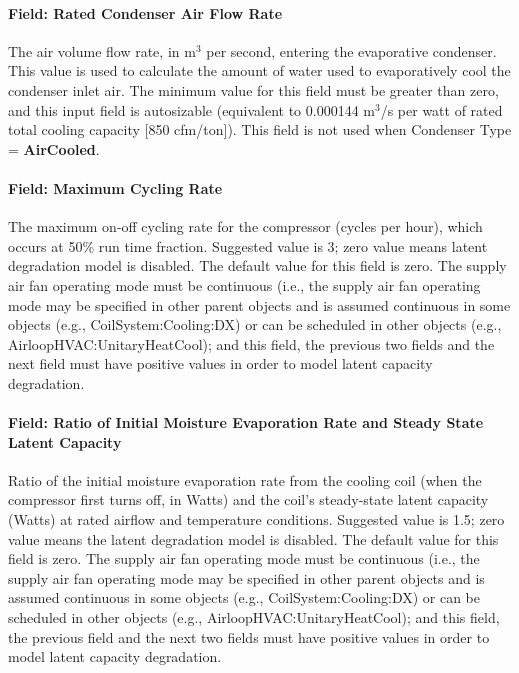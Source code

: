 \paragraph{Field: Rated Condenser Air Flow Rate}\label{field-rated-condenser-air-flow-rate-2}

The air volume flow rate, in m\(^{3}\) per second, entering the evaporative condenser. This value is used to calculate the amount of water used to evaporatively cool the condenser inlet air. The minimum value for this field must be greater than zero, and this input field is autosizable (equivalent to 0.000144 m\(^{3}\)/s per watt of rated total cooling capacity {[}850 cfm/ton{]}). This field is not used when Condenser Type = \textbf{AirCooled}.

\paragraph{Field: Maximum Cycling Rate}

The maximum on-off cycling rate for the compressor (cycles per hour), which occurs at 50\% run time fraction. Suggested value is 3; zero value means latent degradation model is disabled. The default value for this field is zero. The supply air fan operating mode must be continuous (i.e., the supply air fan operating mode may be specified in other parent objects and is assumed continuous in some objects (e.g., CoilSystem:Cooling:DX) or can be scheduled in other objects (e.g., AirloopHVAC:UnitaryHeatCool); and this field, the previous two fields and the next field must have positive values in order to model latent capacity degradation.

\paragraph{Field: Ratio of Initial Moisture Evaporation Rate and Steady State Latent Capacity}

Ratio of the initial moisture evaporation rate from the cooling coil (when the compressor first turns off, in Watts) and the coil's steady-state latent capacity (Watts) at rated airflow and temperature conditions. Suggested value is 1.5; zero value means the latent degradation model is disabled. The default value for this field is zero. The supply air fan operating mode must be continuous (i.e., the supply air fan operating mode may be specified in other parent objects and is assumed continuous in some objects (e.g., CoilSystem:Cooling:DX) or can be scheduled in other objects (e.g., AirloopHVAC:UnitaryHeatCool); and this field, the previous field and the next two fields must have positive values in order to model latent capacity degradation.

